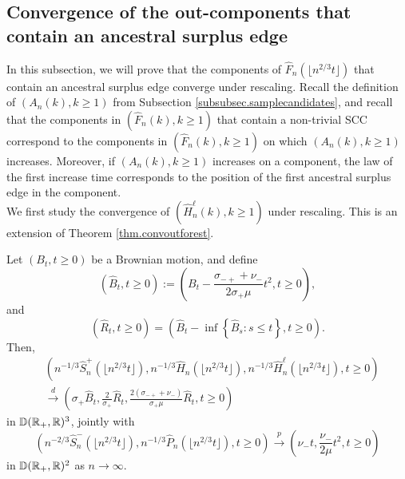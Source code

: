 \subsection{Convergence of the out-components that contain an ancestral surplus edge}\label{subsec.ancestral}
In this subsection, we will prove that the components of $\hat{F}_n\left(\lfloor n^{2/3}t\rfloor\right)$ that contain an ancestral surplus edge converge under rescaling. Recall the definition of $(A_n(k),k\geq 1)$ from Subsection \ref{subsubsec.samplecandidates}, and recall that the components in $(\hat{F}_n(k),k\geq 1)$ that contain a non-trivial SCC correspond to the components in $(\hat{F}_n(k),k\geq 1)$ on which $(A_n(k),k\geq 1)$ increases. Moreover, if $(A_n(k),k\geq 1)$ increases on a component, the law of the first increase time corresponds to the position of the first ancestral surplus edge in the component. \\
We first study the convergence of $(\hat{H}_n^\ell(k),k\geq 1)$ under rescaling. This is an extension of Theorem \ref{thm.convoutforest}.
\begin{lemma}\label{lemma.heightprocesswithlengths}
Let $(B_t, t\geq 0)$ be a Brownian motion, and define
$$(\hat{B}_t,t\geq 0):=\left( B_t-\frac{\sigma_{-+}+\nu_-}{2\sigma_+ \mu}t^2, t\geq 0\right),$$ and $$(\hat{R}_t,t\geq 0)=\left(\hat{B}_t-\inf\left\{\hat{B}_s: s\leq t\right\},t\geq 0\right).$$ 
Then,
\begin{align*}&\left(n^{-1/3}\hat{S}^{+}_n\left(\lfloor n^{2/3}t\rfloor \right),n^{-1/3}\hat{H}_{n}\left(\lfloor n^{2/3}t\rfloor \right),n^{-1/3}\hat{H}^\ell_{n}\left(\lfloor n^{2/3}t\rfloor \right),  t\geq 0\right)\\
&\overset{d}{\to}\left(\sigma_+ \hat{B}_t, \frac{2}{\sigma_+} \hat{R}_t,\frac{2(\sigma_{-+}+\nu_-)}{\sigma_+\mu} \hat{R}_t, t\geq 0\right)\end{align*}
in ${\mathbb D}({\mathbb R}_+,{\mathbb R})^3$,
jointly with 
$$\left(n^{-2/3}\hat{S}_n^-\left(\lfloor n^{2/3}t\rfloor \right), n^{-1/3}\hat{P}_n\left(\lfloor n^{2/3}t\rfloor \right),t\geq 0\right)\overset{p}{\to}\left(\nu_-t,  \frac{\nu_-}{2\mu} t^2, t\geq 0\right)$$
in ${\mathbb D}({\mathbb R}_+,{\mathbb R})^2$ as $n\to \infty$.
\end{lemma}
